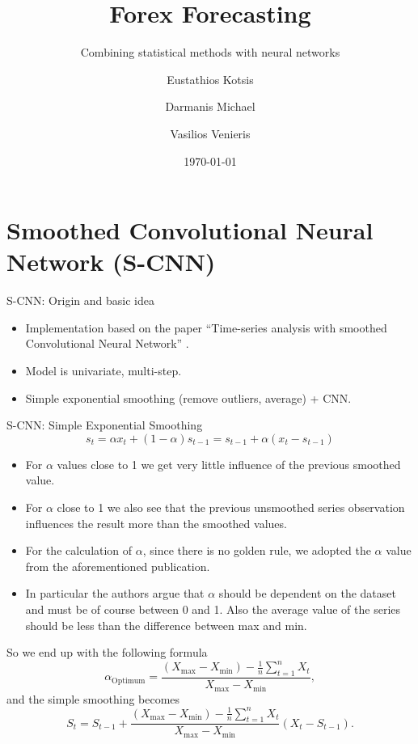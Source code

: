 \documentclass[aspectratio=169, 12pt]{beamer}
\title{Forex Forecasting}
\subtitle{Combining statistical methods with neural networks}
\author{Eustathios Kotsis \inst{1} \and Darmanis Michael \inst{1} \and Vasilios Venieris \inst{1}}
\institute{\inst{1} National and Kapodistrian University of Athens}
\date{\today}
\begin{document}
\maketitle

\section{Smoothed Convolutional Neural Network (S-CNN)}

\begin{frame}{S-CNN: Origin and basic idea}
    \begin{itemize}
        \item Implementation based on the paper ``Time-series analysis with smoothed Convolutional Neural Network''\cite{e-cnn} .
        \item Model is univariate, multi-step.
        \item Simple exponential smoothing (remove outliers, average) + CNN.
    \end{itemize}
\end{frame}

\begin{frame}[allowframebreaks]{S-CNN: Simple Exponential Smoothing}
  \begin{equation*}
    \displaystyle s_{t}=\alpha x_{t}+(1-\alpha )s_{t-1}=s_{t-1}+\alpha (x_{t}-s_{t-1})
  \end{equation*}
    \begin{itemize}
        \item For $\alpha$ values close to 1 we get very little influence of the previous smoothed value.
        \item For $\alpha$ close to 1 we also see that the previous unsmoothed series observation influences the result more than the smoothed values.
        \item For the calculation of $\alpha$, since there is no golden rule, we adopted the $\alpha$ value from the aforementioned publication.
        \item In particular the authors argue that $\alpha$ should be dependent on the dataset and must be of course between 0 and 1. Also the average value of the series should be less than the difference between max and min.
    \end{itemize}
So we end up with the following formula
\begin{equation*}
\alpha_{\text{Optimum}} = \frac{\left( X_{\text{max}} - X_{\text{min}} \right) - \frac{1}{n} \sum_{t=1}^{n} X_t}{X_{\text{max}} - X_{\text{min}}},
\end{equation*}
and the simple smoothing becomes
\begin{equation*}
S_t = S_{t-1} + \frac{\left( X_{\text{max}} - X_{\text{min}} \right) - \frac{1}{n} \sum_{t=1}^{n} X_t}{X_{\text{max}} - X_{\text{min}}} \left( X_t - S_{t-1} \right) .
\end{equation*}
\end{frame}
\end{document}

